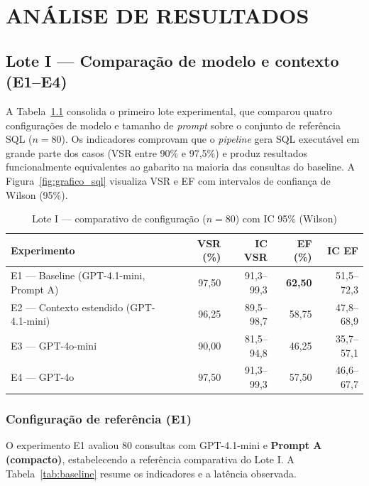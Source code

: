 \chapter{\MakeUppercase{Análise de Resultados}}

\section{Lote I --- Comparação de modelo e contexto (E1--E4)}

A Tabela~\ref{tab:v3} consolida o primeiro lote experimental, que comparou quatro configurações de modelo e tamanho de \textit{prompt} sobre o conjunto de referência SQL ($n=80$). Os indicadores comprovam que o \textit{pipeline} gera SQL executável em grande parte dos casos (VSR entre 90\% e 97,5\%) e produz resultados funcionalmente equivalentes ao gabarito na maioria das consultas do baseline. A Figura~\ref{fig:grafico_sql} visualiza VSR e EF com intervalos de confiança de Wilson (95\%).

\begin{table}[htbp]
\centering
\caption{Lote I --- comparativo de configuração ($n=80$) com IC 95\% (Wilson)}
\label{tab:v3}
\small
\begin{tabular}{lrrrr}
\toprule
\textbf{Experimento} & \textbf{VSR (\%)} & \textbf{IC VSR} & \textbf{EF (\%)} & \textbf{IC EF} \\
\midrule
E1 --- Baseline (GPT-4.1-mini, Prompt A) & 97,50 & 91,3--99,3 & \textbf{62,50} & 51,5--72,3 \\
E2 --- Contexto estendido (GPT-4.1-mini) & 96,25 & 89,5--98,7 & 58,75 & 47,8--68,9 \\
E3 --- GPT-4o-mini & 90,00 & 81,5--94,8 & 46,25 & 35,7--57,1 \\
E4 --- GPT-4o & 97,50 & 91,3--99,3 & 57,50 & 46,6--67,7 \\
\bottomrule
\end{tabular}
\end{table}

\FloatBarrier

\FloatBarrier

\subsection{Configuração de referência (E1)}

O experimento E1 avaliou 80 consultas com GPT-4.1-mini e \textbf{Prompt A (compacto)}, estabelecendo a referência comparativa do Lote I. A Tabela~\ref{tab:baseline} resume os indicadores e a latência observada.

